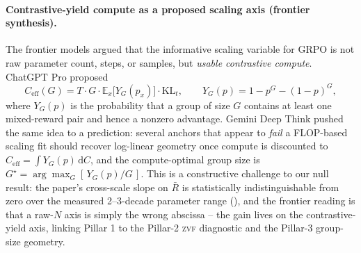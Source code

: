 \paragraph{Contrastive-yield compute as a proposed scaling axis (frontier synthesis).}
The frontier models argued that the informative scaling variable for GRPO is
not raw parameter count, steps, or samples, but \emph{usable contrastive
compute}. ChatGPT Pro proposed
\begin{equation}
  \label{eq:frontier-ceff}
  C_{\mathrm{eff}}(G) = T \cdot G \cdot
      \mathbb{E}_x\!\bigl[Y_G(p_x)\bigr] \cdot \mathrm{KL}_t,
  \qquad
  Y_G(p) = 1 - p^{G} - (1-p)^{G},
\end{equation}
where $Y_G(p)$ is the probability that a group of size $G$ contains at least
one mixed-reward pair and hence a nonzero advantage. Gemini Deep Think pushed
the same idea to a prediction: several anchors that appear to \emph{fail} a
FLOP-based scaling fit should recover log-linear geometry once compute is
discounted to $C_{\mathrm{eff}}=\int Y_G(p)\,\mathrm{d}C$, and the
compute-optimal group size is $G^\star = \arg\max_G [\,Y_G(p)/G\,]$. This is a
constructive challenge to our null result: the paper's cross-scale slope on
$\bar R$ is statistically indistinguishable from zero over the measured 2--3-decade
parameter range (), and the frontier reading is that a
raw-$N$ axis is simply the wrong abscissa -- the gain lives on the
contrastive-yield axis, linking Pillar 1 to the Pillar-2 \textsc{zvf}
diagnostic and the Pillar-3 group-size geometry.

